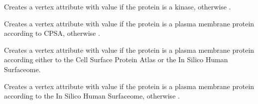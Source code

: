 \documentclass[letterpaper,10pt,english]{sphinxmanual}
\begin{document}
\begin{fulllineitems}
\begin{fulllineitems}
\begin{quote}
\begin{description}
\end{description}\end{quote}

\end{fulllineitems}


\begin{fulllineitems}
\label{\detokenize{main:pypath.main.PyPath.set_kinases}}
Creates a vertex attribute  with value  if
the protein is a kinase, otherwise .

\end{fulllineitems}


\begin{fulllineitems}
\label{\detokenize{main:pypath.main.PyPath.set_plasma_membrane_proteins_cspa}}
Creates a vertex attribute  with value  if
the protein is a plasma membrane protein according to CPSA,
otherwise .

\end{fulllineitems}


\begin{fulllineitems}
\label{\detokenize{main:pypath.main.PyPath.set_plasma_membrane_proteins_cspa_surfaceome}}
Creates a vertex attribute  with value  if
the protein is a plasma membrane protein according either to the
Cell Surface Protein Atlas or the In Silico Human Surfaceome.

\end{fulllineitems}


\begin{fulllineitems}
\label{\detokenize{main:pypath.main.PyPath.set_plasma_membrane_proteins_surfaceome}}
Creates a vertex attribute  with value  if
the protein is a plasma membrane protein according to the In Silico
Human Surfaceome, otherwise .


\end{fulllineitems}
\end{fulllineitems}
\end{document}
